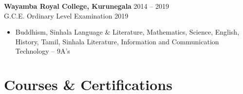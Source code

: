 \documentclass[10pt,a4paper]{article}
\begin{document}
\vspace{0.3cm}

\textbf{Wayamba Royal College, Kurunegala} \hfill 2014 -- 2019 \\
G.C.E. Ordinary Level Examination 2019 
\begin{itemize}[leftmargin=*]

 \item Buddhism, Sinhala Language \& Literature, Mathematics, Science, English, History, Tamil, Sinhala Literature, Information and Communication Technology -- 9A's
    
   
\end{itemize}


\section*{Courses \& Certifications}
\end{document}
